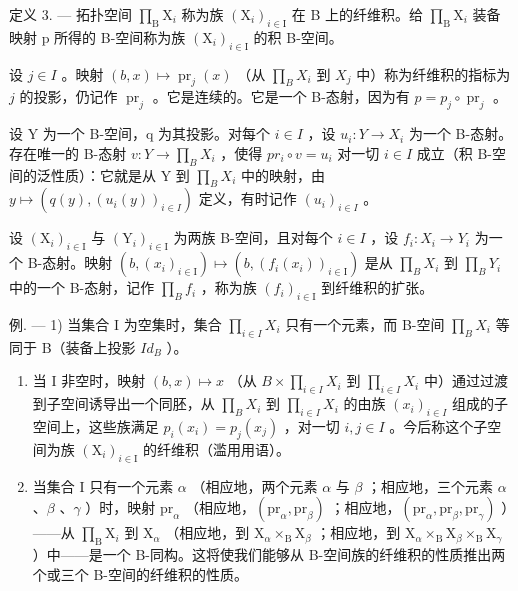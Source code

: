 定义 3. --- 拓扑空间 \(\prod_{\mathrm{B}} \mathrm{X}_i\) 称为族 \((\mathrm{X}_i)_{i \in \mathrm{I}}\) 在 B 上的纤维积。给 \(\prod_{\mathrm{B}} \mathrm{X}_i\) 装备映射 p 所得的 B-空间称为族 \((\mathrm{X}_i)_{i \in \mathrm{I}}\) 的积 B-空间。

设 \(j \in I\) 。映射 \((b, x) \mapsto \operatorname{pr}_j(x)\) （从 \(\prod_B X_i\) 到 \(X_j\) 中）称为纤维积的指标为 \(j\) 的投影，仍记作 \(\operatorname{pr}_j\) 。它是连续的。它是一个 B-态射，因为有 \(p = p_j \circ \operatorname{pr}_j\) 。

设 Y 为一个 B-空间，q 为其投影。对每个 \(i \in I\) ，设 \(u_i \colon Y \to X_i\) 为一个 B-态射。存在唯一的 B-态射 \(v \colon Y \to \prod_{B} X_i\) ，使得 \(pr_i \circ v = u_i\) 对一切 \(i \in I\) 成立（积 B-空间的泛性质）：它就是从 Y 到 \(\prod_{B} X_i\) 中的映射，由 \(y \mapsto (q(y), (u_i(y))_{i \in I})\) 定义，有时记作 \((u_i)_{i \in I}\) 。

设 \((\mathrm{X}_{i})_{i\in\mathrm{I}}\) 与 \((\mathrm{Y}_{i})_{i\in\mathrm{I}}\) 为两族 B-空间，且对每个 \(i\in I\) ，设 \(f_{i}\colon X_{i}\to Y_{i}\) 为一个 B-态射。映射 \((b,(x_{i})_{i\in\mathrm{I}})\mapsto(b,(f_{i}(x_{i}))_{i\in\mathrm{I}})\) 是从 \(\prod_{B}X_{i}\) 到 \(\prod_{B}Y_{i}\) 中的一个 B-态射，记作 \(\prod_{B}f_{i}\) ，称为族 \((f_{i})_{i\in\mathrm{I}}\) 到纤维积的扩张。

例. --- 1) 当集合 I 为空集时，集合 \(\prod_{i\in I}X_i\) 只有一个元素，而 B-空间 \(\prod_{B}X_{i}\) 等同于 B（装备上投影 \(Id_B\) ）。

\begin{enumerate}
\def\labelenumi{\arabic{enumi})}
\setcounter{enumi}{1}
\item
  当 I 非空时，映射 \((b,x)\mapsto x\) （从 \(B\times\prod_{i\in I}X_{i}\) 到 \(\prod_{i\in I}X_{i}\) 中）通过过渡到子空间诱导出一个同胚，从 \(\prod_{B}X_{i}\) 到 \(\prod_{i\in I}X_{i}\) 的由族 \((x_{i})_{i\in I}\) 组成的子空间上，这些族满足 \(p_{i}(x_{i})=p_{j}(x_{j})\) ，对一切 \(i,j\in I\) 。今后称这个子空间为族 \((\mathrm{X}_{i})_{i\in\mathrm{I}}\) 的纤维积（滥用用语）。
\item
  当集合 I 只有一个元素 \(\alpha\) （相应地，两个元素 \(\alpha\) 与 \(\beta\) ；相应地，三个元素 \(\alpha\) 、\(\beta\) 、\(\gamma\) ）时，映射 \(\mathrm{pr}_{\alpha}\) （相应地，\((\mathrm{pr}_{\alpha}, \mathrm{pr}_{\beta})\) ；相应地，\((\mathrm{pr}_{\alpha}, \mathrm{pr}_{\beta}, \mathrm{pr}_{\gamma})\) ）——从 \(\prod_{\mathrm{B}} \mathrm{X}_i\) 到 \(\mathrm{X}_{\alpha}\) （相应地，到 \(\mathrm{X}_{\alpha} \times_{\mathrm{B}} \mathrm{X}_{\beta}\) ；相应地，到 \(\mathrm{X}_{\alpha} \times_{\mathrm{B}} \mathrm{X}_{\beta} \times_{\mathrm{B}} \mathrm{X}_{\gamma}\) ）中——是一个 B-同构。这将使我们能够从 B-空间族的纤维积的性质推出两个或三个 B-空间的纤维积的性质。
\end{enumerate}

